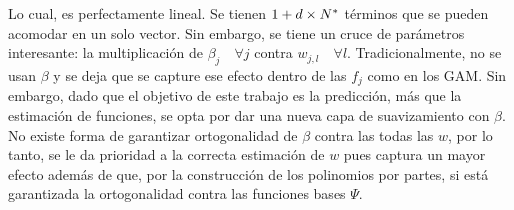 \documentclass[../Main/Main.tex]{subfiles}
\begin{document}
Lo cual, es perfectamente lineal. Se tienen $1 + d\times N^*$ términos que se pueden acomodar en un solo vector. Sin embargo, se tiene un cruce de parámetros interesante: la multiplicación de $\beta_j\quad \forall j$ contra $w_{j,l} \quad \forall l$. Tradicionalmente, no se usan $\beta$ y se deja que se capture ese efecto dentro de las $f_j$ como en los GAM. Sin embargo, dado que el objetivo de este trabajo es la predicción, más que la estimación de funciones, se opta por dar una nueva capa de suavizamiento con $\beta$. No existe forma de garantizar ortogonalidad de $\beta$ contra las todas las $w$, por lo tanto, se le da prioridad a la correcta estimación de $w$ pues captura un mayor efecto además de que, por la construcción de los polinomios por partes, si está garantizada la ortogonalidad contra las funciones bases $\Psi$.
\end{document}
